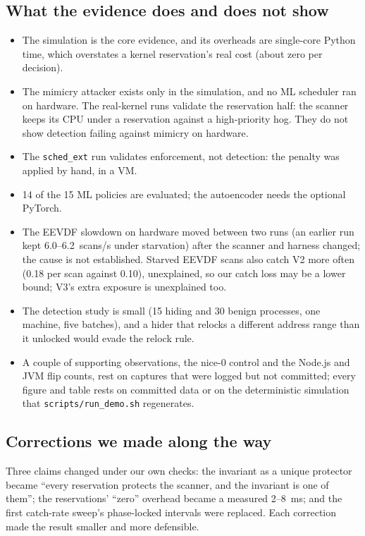 \documentclass[conference]{IEEEtran}
\begin{document}
\subsection{What the evidence does and does not show}
\begin{itemize}
\item The simulation is the core evidence, and its overheads are single-core
Python time, which overstates a kernel reservation's real cost (about zero per
decision).
\item The mimicry attacker exists only in the simulation, and no ML scheduler
ran on hardware. The real-kernel runs validate the reservation half: the
scanner keeps its CPU under a reservation against a high-priority hog. They do
not show detection failing against mimicry on hardware.
\item The \texttt{sched\_ext} run validates enforcement, not detection: the
penalty was applied by hand, in a VM.
\item 14 of the 15 ML policies are evaluated; the autoencoder needs the
optional PyTorch.
\item The EEVDF slowdown on hardware moved between two runs (an earlier run kept
6.0--6.2~scans/s under starvation) after the scanner and harness changed; the
cause is not established. Starved EEVDF scans also catch V2 more often (0.18 per
scan against 0.10), unexplained, so our catch loss may be a lower bound; V3's
extra exposure is unexplained too.
\item The detection study is small (15 hiding and 30 benign processes, one machine, five
batches), and a hider that relocks a different address range than it unlocked
would evade the relock rule.
\item A couple of supporting observations, the nice-0 control and the Node.js
and JVM flip counts, rest on captures that were logged but not committed; every
figure and table rests on committed data or on the deterministic simulation
that \texttt{scripts/run\_demo.sh} regenerates.
\end{itemize}

\subsection{Corrections we made along the way}
Three claims changed under our own checks: the invariant as a unique protector
became ``every reservation protects the scanner, and the invariant is one of
them''; the reservations' ``zero'' overhead became a measured 2--8~ms; and
the first catch-rate sweep's phase-locked intervals were replaced. Each correction made the result smaller and more defensible.
\end{document}
